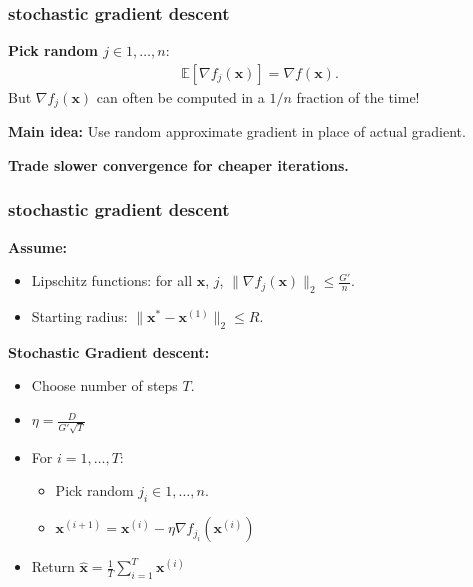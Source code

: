 \documentclass[compress]{beamer}
\newcommand{\bv}[1]{\mathbf{#1}}
\newcommand{\E}{\mathbb{E}}
\begin{document}
\begin{frame}
	\frametitle{stochastic gradient descent}
	\textbf{Pick random $j \in 1, \ldots, n$}:
	\begin{align*}
	\E\left[\nabla f_j(\bv{x})\right] = \nabla f(\bv{x}).
	\end{align*}
	But $\nabla f_j(\bv{x})$ can often be computed in a $1/n$ fraction of the time!
	
	\vspace{3em}
	{\textbf{Main idea:} Use random approximate gradient in place of actual gradient.}
	
	\begin{center}
	 	\alert{\textbf{Trade slower convergence for cheaper iterations.}}
	 \end{center}
\end{frame}

\begin{frame}[t]
	\frametitle{stochastic gradient descent}
	\textbf{Assume:}
	\begin{itemize}
		\item Lipschitz functions: for all $\bv{x}$, $j$, \alert{$\|\nabla f_j(\bv{x})\|_2 \leq \frac{G'}{n}$.}
		\item Starting radius: \alert{$\|\bv{x}^{*} - \bv{x}^{(1)}\|_2 \leq R$.}
	\end{itemize}
	
	\textbf{Stochastic Gradient descent:}
	\begin{itemize}
		\item Choose number of steps $T$.
		\item $\eta = \frac{D}{G'\sqrt{T}}$
		\item For $i = 1,\ldots, T$:
		\begin{itemize}
			\item Pick random $j_i \in 1, \ldots, n$.
			\item $\bv{x}^{(i+1)} = \bv{x}^{(i)} - \eta \nabla f_{j_i}(\bv{x}^{(i)})$
		\end{itemize}
		\item Return $\hat{\bv{x}} = \frac{1}{T}\sum_{i=1}^T \bv{x}^{(i)}$
	\end{itemize}
\end{frame}
\end{document}
